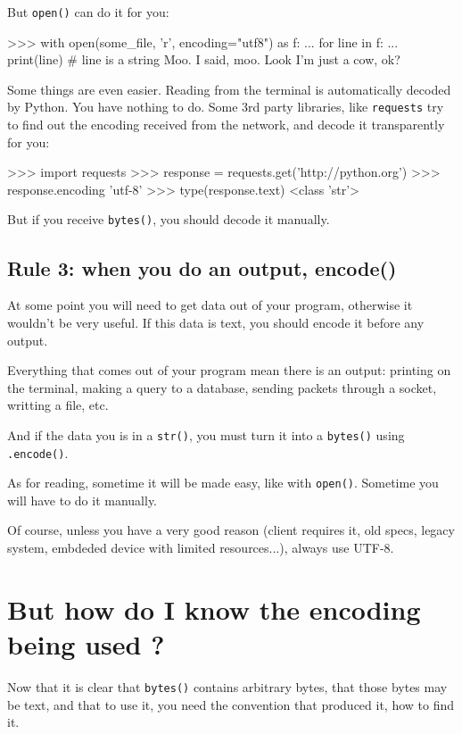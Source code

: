 But \lstinline{open()} can do it for you:

\begin{py3}
>>> with open(some_file, 'r', encoding="utf8") as f:
...     for line in f:
...         print(line) # line is a string
Moo.
I said, moo.
Look I'm just a cow, ok?
\end{py3}

Some things are even easier. Reading from the terminal is automatically decoded by Python. You have nothing to do. Some 3rd party libraries, like \lstinline{requests} try to find out the encoding received from the network, and decode it transparently for you:

\begin{py3}
>>> import requests
>>> response = requests.get('http://python.org')
>>> response.encoding
'utf-8'
>>> type(response.text)
<class 'str'>
\end{py3}

But if you receive \lstinline{bytes()}, you should decode it manually.

\subsection{Rule 3: when you do an output, encode()}

At some point you will need to get data out of your program, otherwise it wouldn't be very useful. If this data is text, you should encode it before any output.

Everything that comes out of your program mean there is an output: printing on the terminal, making a query to a database, sending packets through a socket, writting a file, etc.

And if the data you is in a \lstinline{str()}, you must turn it into a \lstinline{bytes()} using \lstinline{.encode()}.

As for reading, sometime it will be made easy, like with \lstinline{open()}. Sometime you will have to do it manually.

Of course, unless you have a very good reason (client requires it, old specs, legacy system, embdeded device with limited resources...), always use UTF-8.

\section{But how do I know the encoding being used ?}

Now that it is clear that \lstinline{bytes()} contains arbitrary bytes, that those bytes may be text, and that to use it, you need the convention that produced it, how to find it.

